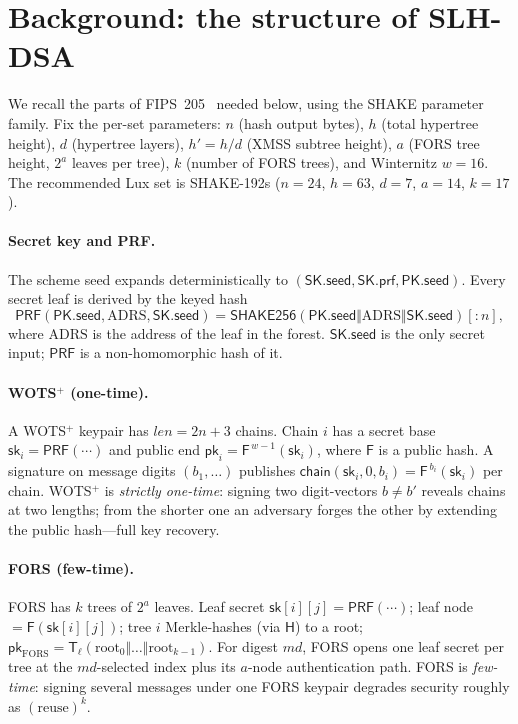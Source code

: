 \documentclass[11pt,a4paper]{article}
\newcommand{\PRF}{\mathsf{PRF}}
\newcommand{\Fhash}{\mathsf{F}}
\newcommand{\Hhash}{\mathsf{H}}
\newcommand{\Tl}{\mathsf{T}_{\ell}}
\newcommand{\skseed}{\mathsf{SK.seed}}
\newcommand{\skprf}{\mathsf{SK.prf}}
\newcommand{\pkseed}{\mathsf{PK.seed}}
\newcommand{\chain}{\mathsf{chain}}
\begin{document}
\section{Background: the structure of SLH-DSA}
\label{sec:background}

We recall the parts of FIPS~205~\cite{fips205} needed below, using the SHAKE
parameter family. Fix the per-set parameters: $n$ (hash output bytes), $h$ (total
hypertree height), $d$ (hypertree layers), $h' = h/d$ (XMSS subtree height), $a$
(FORS tree height, $2^a$ leaves per tree), $k$ (number of FORS trees), and
Winternitz $w=16$. The recommended Lux set is SHAKE-192s ($n=24$, $h=63$, $d=7$,
$a=14$, $k=17$).

\paragraph{Secret key and PRF.}
The scheme seed expands deterministically to
$(\skseed, \skprf, \pkseed)$. Every secret leaf is derived by the keyed hash
\begin{equation}
\PRF(\pkseed,\mathrm{ADRS},\skseed) = \mathsf{SHAKE256}(\pkseed \Vert \mathrm{ADRS} \Vert \skseed)[{:}n],
\label{eq:prf}
\end{equation}
where $\mathrm{ADRS}$ is the address of the leaf in the forest. $\skseed$ is the
only secret input; $\PRF$ is a non-homomorphic hash of it.

\paragraph{WOTS$^+$ (one-time).}
A WOTS$^+$ keypair has $\mathit{len} = 2n + 3$ chains. Chain $i$ has a secret base
$\mathsf{sk}_i = \PRF(\cdots)$ and public end
$\mathsf{pk}_i = \Fhash^{\,w-1}(\mathsf{sk}_i)$, where $\Fhash$ is a public hash.
A signature on message digits $(b_1,\dots)$ publishes
$\chain(\mathsf{sk}_i, 0, b_i) = \Fhash^{\,b_i}(\mathsf{sk}_i)$ per chain. WOTS$^+$
is \emph{strictly one-time}: signing two digit-vectors $b \neq b'$ reveals chains
at two lengths; from the shorter one an adversary forges the other by extending the
public hash---full key recovery.

\paragraph{FORS (few-time).}
FORS has $k$ trees of $2^a$ leaves. Leaf secret $\mathsf{sk}[i][j] = \PRF(\cdots)$;
leaf node $= \Fhash(\mathsf{sk}[i][j])$; tree $i$ Merkle-hashes (via $\Hhash$) to a
root; $\mathsf{pk}_{\mathrm{FORS}} = \Tl(\text{root}_0 \Vert \dots \Vert
\text{root}_{k-1})$. For digest $md$, FORS opens one leaf secret per tree at the
$md$-selected index plus its $a$-node authentication path. FORS is
\emph{few-time}: signing several messages under one FORS keypair degrades security
roughly as $(\text{reuse})^{k}$.
\end{document}
